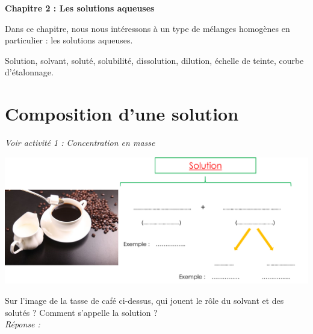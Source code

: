 \renewcommand{\thesubsection}{\textcolor{red}{\Roman{section}.\arabic{subsection}}}
\renewcommand{\thesubsubsection}{\textcolor{red}{\Roman{section}.\arabic{subsection}.\alph{subsubsection}}}

\setcounter{section}{0}
\sndEnTeteCoursDeux

\begin{mdframed}[style=titr, leftmargin=60pt, rightmargin=60pt, innertopmargin=7pt, innerbottommargin=7pt, innerrightmargin=8pt, innerleftmargin=8pt]

\begin{center}
\large{\textbf{Chapitre 2 : Les solutions aqueuses}}
\end{center}
\end{mdframed}
Dans ce chapitre, nous nous intéressons à un type de mélanges homogènes en particulier : les solutions aqueuses. 

\begin{tcolorbox}[colback=blue!5!white,colframe=blue!75!black,title=Mots clés du chapitre :]
Solution, solvant, soluté, solubilité, dissolution, dilution, échelle de teinte, courbe d'étalonnage. 
\end{tcolorbox}


\section{Composition d'une solution}
\begin{Large}
\end{Large}\textit{Voir activité 1 : Concentration en masse}
\begin{tcolorbox}[colback=green!5!white,colframe=green!75!black,title=\textbf{Solution, solvant, soluté}]
\begin{center}
    \includegraphics[width=\textwidth]{Images/Chapitre_2/Solution_def.png}
\end{center}
\end{tcolorbox}
Sur l'image de la tasse de café ci-dessus, qui jouent le rôle du solvant et des solutés ? Comment s'appelle la solution ?\\
\textit{Réponse :} \\

